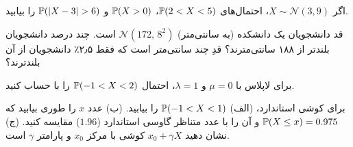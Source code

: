 \begin{exercise}
اگر $X\sim\mathcal N(3,9)$، احتمال‌های $\P(2<X<5)$، $\P(X>0)$ و $\P(|X-3|>6)$ را بیابید.
\end{exercise}

\begin{exercise}
قد دانشجویان یک دانشکده (به سانتی‌متر) $\mathcal N(172,\,8^2)$ است. چند درصد دانشجویان بلندتر از ۱۸۸ سانتی‌مترند؟ قدِ چند سانتی‌متر است که فقط ۲٫۵٪ دانشجویان از آن بلندترند؟
\end{exercise}

\begin{exercise}
برای لاپلاس با $\mu=0$ و $\lambda=1$، احتمال $\P(-1<X<2)$ را با  حساب کنید.
\end{exercise}

\begin{exercise}
برای کوشی استاندارد، (الف) $\P(-1<X<1)$ را بیابید. (ب) عدد $x$ را طوری بیابید که $\P(X\le x)=0.975$ و آن را با عدد متناظر گاوسی استاندارد ($1.96$) مقایسه کنید. (ج) نشان دهید $x_0+\gamma X$ کوشی با مرکز $x_0$ و پارامتر $\gamma$ است.
\end{exercise}
